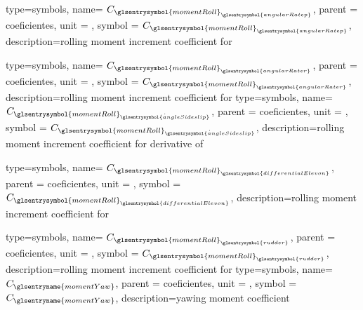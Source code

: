 {type=symbols,
    name= \ensuremath{C_{{\glsentrysymbol{momentRoll}}_{\glsentrysymbol{angularRatep}}}},
    parent = {coeficientes},
    unit = \unexpanded{},
    symbol = \ensuremath{C_{{\glsentrysymbol{momentRoll}}_{\glsentrysymbol{angularRatep}}}},
    description={rolling moment increment coefficient for }
}

{type=symbols,
    name= \ensuremath{C_{{\glsentrysymbol{momentRoll}}_{\glsentrysymbol{angularRater}}}},
    parent = {coeficientes},
    unit = \unexpanded{},
    symbol = \ensuremath{C_{{\glsentrysymbol{momentRoll}}_{\glsentrysymbol{angularRater}}}},
    description={rolling moment increment coefficient for }
}
{type=symbols,
    name= \ensuremath{C_{{\glsentrysymbol{momentRoll}}_{\dot{\glsentrysymbol{angleSideslip}}}}},
    parent = {coeficientes},
    unit = \unexpanded{},
    symbol = \ensuremath{C_{{\glsentrysymbol{momentRoll}}_{\dot{\glsentrysymbol{angleSideslip}}}}},
    description={rolling moment increment coefficient for derivative of }
}


{type=symbols,
    name= \ensuremath{C_{{\glsentrysymbol{momentRoll}}_{\glsentrysymbol{differentialElevon}}}},
    parent = {coeficientes},
    unit = \unexpanded{},
    symbol = \ensuremath{C_{{\glsentrysymbol{momentRoll}}_{\glsentrysymbol{differentialElevon}}}},
    description={rolling moment increment coefficient for }
}

{type=symbols,
    name= \ensuremath{C_{{\glsentrysymbol{momentRoll}}_{\glsentrysymbol{rudder}}}},
    parent = {coeficientes},
    unit = \unexpanded{},
    symbol = \ensuremath{C_{{\glsentrysymbol{momentRoll}}_{\glsentrysymbol{rudder}}}},
    description={rolling moment increment coefficient for }
}
{type=symbols,
    name= \ensuremath{C_\glsentryname{momentYaw}},
    parent = {coeficientes},
    unit = \unexpanded{},
    symbol = \ensuremath{C_\glsentryname{momentYaw}},
    description={yawing moment coefficient}
}

